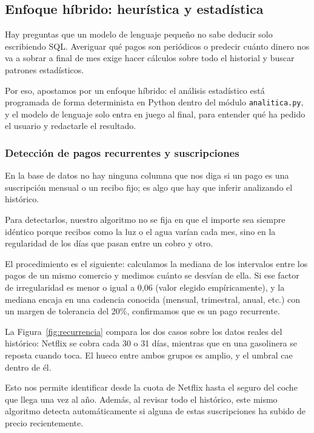 \subsection{Enfoque híbrido: heurística y estadística}

Hay preguntas que un modelo de lenguaje pequeño no sabe deducir solo escribiendo SQL. Averiguar qué pagos son periódicos 
o predecir cuánto dinero nos va a sobrar a final de mes exige hacer cálculos sobre todo el historial y buscar patrones 
estadísticos.   

Por eso, apostamos por un enfoque híbrido: el análisis estadístico está programada de forma determinista en Python 
dentro del módulo \texttt{analitica.py}, y el modelo de lenguaje solo entra en juego al final, para entender qué ha pedido 
el usuario y redactarle el resultado.

\subsubsection{Detección de pagos recurrentes y suscripciones}

En la base de datos no hay ninguna columna que nos diga si un pago es una suscripción mensual
o un recibo fijo; es algo que hay que inferir analizando el histórico.

Para detectarlos, nuestro algoritmo no se fija en que el importe sea siempre idéntico 
porque recibos como la luz o el agua varían cada mes, sino en la regularidad de los 
días que pasan entre un cobro y otro.

El procedimiento es el siguiente: calculamos la mediana de los intervalos entre los pagos 
de un mismo comercio y medimos cuánto se desvían de ella. Si ese factor de irregularidad es menor o igual 
a 0,06 (valor elegido empíricamente), y la mediana encaja en una cadencia conocida (mensual, trimestral, anual, etc.) con un margen de 
tolerancia del 20\%, confirmamos que es un pago recurrente.

La Figura~\ref{fig:recurrencia} compara los dos casos sobre los datos reales del
histórico: Netflix se cobra cada 30 o 31 días, mientras que en una gasolinera se
reposta cuando toca. El hueco entre ambos grupos es amplio, y el umbral cae
dentro de él.



Esto nos permite identificar desde la cuota de Netflix hasta el seguro del coche que llega una vez al año.
Además, al revisar todo el histórico, este mismo algoritmo detecta automáticamente si alguna de estas 
suscripciones ha subido de precio recientemente.

